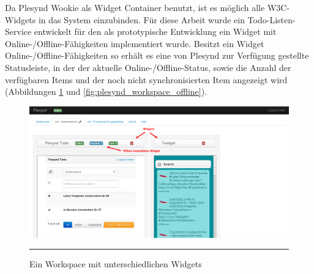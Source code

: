 Da Plesynd Wookie als Widget Container benutzt, ist es möglich alle W3C-Widgets in das System einzubinden. Für diese Arbeit wurde ein Todo-Listen-Service entwickelt für den als prototypische Entwicklung ein Widget mit Online-/Offline-Fähigkeiten implementiert wurde. Besitzt ein Widget Online-/Offline-Fähigkeiten so erhält es eine von Plesynd zur Verfügung gestellte Statusleiste, in der der aktuelle Online-/Offline-Status, sowie die Anzahl der verfügbaren Items und der noch nicht synchronisierten Item angezeigt wird (Abbildungen \ref{fig:plesynd_workspace_online} und \ref{fig:plesynd_workspace_offline}).
\begin{figure}
  \centering
  \includegraphics[width=\textwidth,height=\textheight,keepaspectratio]{./Figures/plesynd_workspace_online.png}
    \rule{35em}{0.5pt}
  \caption[Plesynd User-Interface: Workspace Online]{Ein Workspace mit unterschiedlichen Widgets}
  \label{fig:plesynd_workspace_online}
\end{figure}

